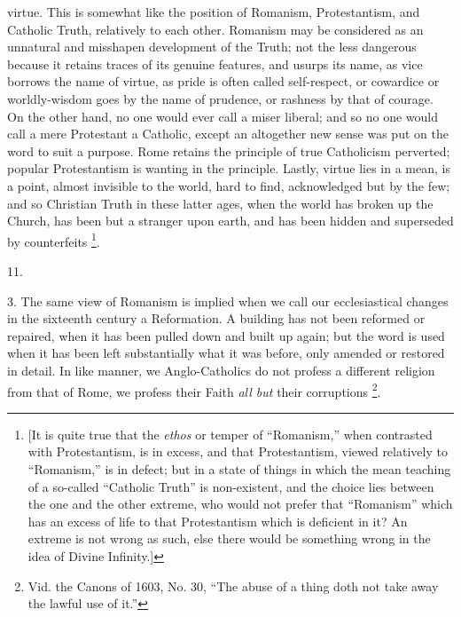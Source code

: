 virtue. This is somewhat like the position of Romanism, Protestantism,
and Catholic Truth, relatively to each other. Romanism may be
considered as an unnatural and misshapen development of the Truth; not
the less dangerous because it retains traces of its genuine features,
and usurps its name, as vice borrows the name of virtue, as pride is
often called self-respect, or cowardice or worldly-wisdom goes by the
name of prudence, or rashness by that of courage. On the other hand,
no one would ever call a miser liberal; and so no one would call a
mere Protestant a Catholic, except an altogether new sense was put on
the word to suit a purpose. Rome retains the principle of true
Catholicism perverted; popular Protestantism is wanting in the
principle. Lastly, virtue lies in a mean, is a point, almost invisible
to the world, hard to find, acknowledged but by the few; and so
Christian Truth in these latter ages, when the world has broken up the
Church, has been but a stranger upon earth, and has been hidden and
superseded by counterfeits \footnote{[It is quite true that the \emph{ethos} or
temper of ``Romanism,'' when contrasted with Protestantism, is
in excess, and that Protestantism, viewed relatively to
``Romanism,'' is in defect; but in a state of things in which
the mean teaching of a so-called ``Catholic Truth'' is
non-existent, and the choice lies between the one and the other
extreme, who would not prefer that ``Romanism'' which has an
excess of life to that Protestantism which is deficient in it? An
extreme is not wrong as such, else there would be something wrong in
the idea of Divine Infinity.]}.

11.

3. The same view of Romanism is implied when we call our
ecclesiastical changes in the sixteenth century a Reformation. A
building has not been reformed or repaired, when it has been pulled
down and built up again; but the word is used when it has been left
substantially what it was before, only amended or restored in detail.
In like manner, we Anglo-Catholics do not profess a different religion
from that of Rome, we profess their Faith \emph{all but} their
corruptions \footnote{Vid. the Canons of 1603, No. 30, ``The
abuse of a thing doth not take away the lawful use of it.''}.

